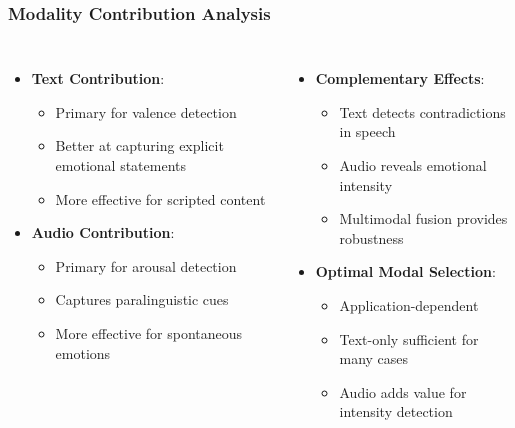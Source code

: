 \begin{frame}
\frametitle{Modality Contribution Analysis}
\begin{columns}
\begin{itemize}
    \item \textbf{Text Contribution}:
    \begin{itemize}
        \item Primary for valence detection
        \item Better at capturing explicit emotional statements
        \item More effective for scripted content
    \end{itemize}
    \item \textbf{Audio Contribution}:
    \begin{itemize}
        \item Primary for arousal detection
        \item Captures paralinguistic cues
        \item More effective for spontaneous emotions
    \end{itemize}
\end{itemize}

\begin{itemize}
    \item \textbf{Complementary Effects}:
    \begin{itemize}
        \item Text detects contradictions in speech
        \item Audio reveals emotional intensity
        \item Multimodal fusion provides robustness
    \end{itemize}
    \item \textbf{Optimal Modal Selection}:
    \begin{itemize}
        \item Application-dependent
        \item Text-only sufficient for many cases
        \item Audio adds value for intensity detection
    \end{itemize}
\end{itemize}
\end{columns}
\end{frame}


